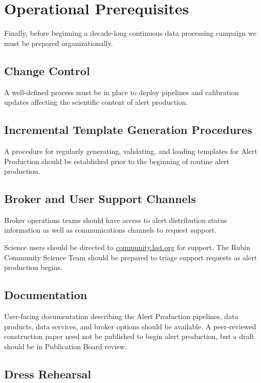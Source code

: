 \documentclass[OPS,authoryear,toc]{lsstdoc}
\begin{document}
\section{Operational Prerequisites}

Finally, before beginning a decade-long continuous data processing campaign we must be prepared organizationally.

\subsection{Change Control}

A well-defined process must be in place to deploy pipelines and calibration updates affecting the scientific content of alert production.

\subsection{Incremental Template Generation Procedures}

A procedure for regularly generating, validating, and loading templates for Alert Production should be established prior to the beginning of routine alert production.

\subsection{Broker and User Support Channels}

Broker operations teams should have access to alert distribution status information as well as communications channels to request support.

Science users should be directed to \url{community.lsst.org} for support.
The Rubin Community Science Team should be prepared to triage support requests as alert production begins.


\subsection{Documentation}

User-facing documentation describing the Alert Production pipelines, data products, data services, and broker options should be available.
A peer-reviewed construction paper need not be published to begin alert production, but a draft should be in Publication Board review.

\subsection{Dress Rehearsal}
\end{document}

